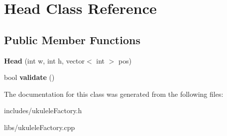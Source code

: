 \hypertarget{class_head}{}\section{Head Class Reference}
\label{class_head}
\subsection*{Public Member Functions}
\begin{DoxyCompactItemize}
\item 
\hypertarget{class_head_a7d836a8ff096ec799372b05a19f6694e}{}\label{class_head_a7d836a8ff096ec799372b05a19f6694e} 
{\bfseries Head} (int w, int h, vector$<$ int $>$ pos)
\item 
\hypertarget{class_head_a0437a4142596636471d6ac877f38dbad}{}\label{class_head_a0437a4142596636471d6ac877f38dbad} 
bool {\bfseries validate} ()
\end{DoxyCompactItemize}


The documentation for this class was generated from the following files\+:\begin{DoxyCompactItemize}
\item 
includes/ukulele\+Factory.\+h\item 
libs/ukulele\+Factory.\+cpp\end{DoxyCompactItemize}
